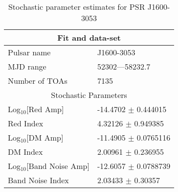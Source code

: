\documentclass{article}
\begin{document}
\begin{table*}
\caption{Stochastic parameter estimates for PSR J1600-3053}
\begin{tabular}{ll}
\hline\hline
\multicolumn{2}{c}{Fit and data-set} \\ 
\hline
Pulsar name\dotfill & J1600-3053 \\ 
MJD range\dotfill & 52302---58232.7 \\ 
Number of TOAs\dotfill & 7135 \\
\hline
\multicolumn{2}{c}{Stochastic Parameters} \\ 
\hline
Log$_{10}$[Red Amp] \dotfill & -14.4702 $\pm$ 0.444015  \\ 
Red Index \dotfill & 4.32126 $\pm$ 0.949385  \\ 
Log$_{10}$[DM Amp] \dotfill & -11.4905 $\pm$ 0.0765116  \\ 
DM Index \dotfill & 2.00961 $\pm$ 0.236955  \\ 
Log$_{10}$[Band Noise Amp] \dotfill & -12.6057 $\pm$ 0.0788739  \\ 
Band Noise Index \dotfill & 2.03433 $\pm$ 0.30357  \\ 
\hline
\end{tabular}
\label{Table:J1600-3053}
\end{table*} 
\end{document}
